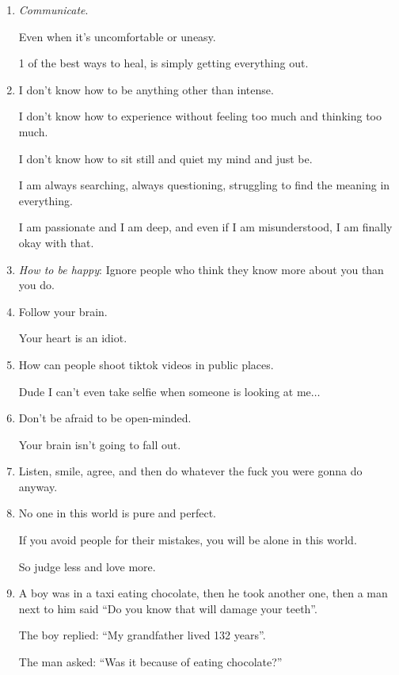 \documentclass{article}
\numberwithin{equation}{section}
\begin{document}
\begin{enumerate}
   \textit{ I've learned that some broken things stay broken, and I've learned that you can get through bad times and keep looking for better ones, as long as you have people who love you}.'' - Jennifer Weiner
    \item \textit{Communicate}.
    
    Even when it's uncomfortable or uneasy.
    
    1 of the best ways to heal, is simply getting everything out.
    \item I don't know how to be anything other than intense.
    
    I don't know how to experience without feeling too much and thinking too much.
    
    I don't know how to sit still and quiet my mind and just be.
    
    I am always searching, always questioning, struggling to find the meaning in everything.
    
    I am passionate and I am deep, and even if I am misunderstood, I am finally okay with that.
    \item \textit{How to be happy}: Ignore people who think they know more about you than you do.
    \item Follow your brain.
    
    Your heart is an idiot.
    \item How can people shoot tiktok videos in public places.
    
    Dude I can't even take selfie when someone is looking at me$\ldots$
    \item Don't be afraid to be open-minded.
    
    Your brain isn't going to fall out.
    \item Listen, smile, agree, and then do whatever the fuck you were gonna do anyway.
    \item No one in this world is pure and perfect.
    
    If you avoid people for their mistakes, you will be alone in this world.
    
    So judge less and love more.
    \item A boy was in a taxi eating chocolate, then he took another one, then a man next to him said ``Do you know that will damage your teeth''.
    
    The boy replied: ``My grandfather lived 132 years''.
    
    The man asked: ``Was it because of eating chocolate?''
    

\end{enumerate}
\end{document}
